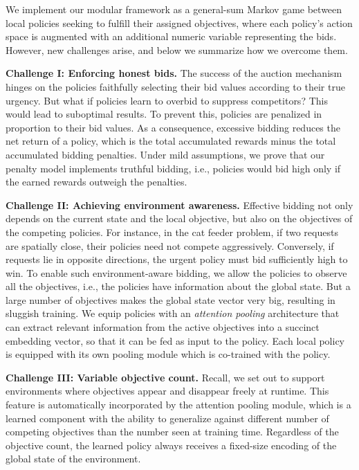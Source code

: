 We implement our modular framework as a general-sum Markov game between local policies seeking to fulfill their assigned objectives, where each policy's action space is augmented with an additional numeric variable representing the bids.
However, new challenges arise, and below we summarize how we overcome them.

\textbf{Challenge I: Enforcing honest bids.}
The success of the auction mechanism hinges on the policies faithfully selecting their bid values according to their true urgency. But what if policies learn to overbid to suppress competitors?
This would lead to suboptimal results. 
To prevent this, policies are penalized in proportion to their bid values.
As a consequence, excessive bidding reduces the net return of a policy, which is the total accumulated rewards minus the total accumulated bidding penalties. 
Under mild assumptions, we prove that our penalty model implements truthful bidding, i.e., policies would bid high only if the earned rewards outweigh the penalties.


\textbf{Challenge II: Achieving environment awareness.}
Effective bidding not only depends on the current state and the local objective, but also on the  objectives of the competing policies. 
For instance, in the cat feeder problem, if two requests are spatially close, their policies need not compete aggressively. 
Conversely, if requests lie in opposite directions, the urgent policy must bid sufficiently high to win. 
To enable such environment-aware bidding, we allow the policies to observe all the objectives, i.e., the policies have information about the global state. 
But a large number of objectives makes the global state vector very big, resulting in sluggish training. 
We equip policies with an \textit{attention pooling} architecture that can extract relevant information from the active objectives into a succinct embedding vector, so that it can be fed as input to the policy.
Each local policy is equipped with its own pooling module which is co-trained with the policy.


\textbf{Challenge III: Variable objective count.}
Recall, we set out to support environments where objectives appear and disappear freely at runtime.
This feature is automatically incorporated by the attention pooling module, which is a learned component with the ability to generalize against different number of competing objectives than the number seen at training time.
Regardless of the objective count, the learned policy always receives a fixed-size encoding of the global state of the environment.

